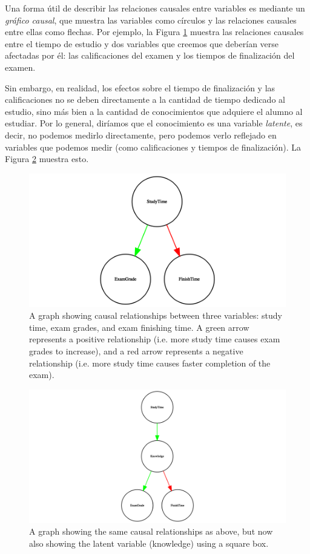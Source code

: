 \documentclass[
  12pt,
]{book}
\begin{document}
Una forma útil de describir las relaciones causales entre variables es mediante un \emph{gráfico causal}, que muestra las variables como círculos y las relaciones causales entre ellas como flechas. Por ejemplo, la Figura \ref{fig:simpleCausalGraph} muestra las relaciones causales entre el tiempo de estudio y dos variables que creemos que deberían verse afectadas por él: las calificaciones del examen y los tiempos de finalización del examen.

Sin embargo, en realidad, los efectos sobre el tiempo de finalización y las calificaciones no se deben directamente a la cantidad de tiempo dedicado al estudio, sino más bien a la cantidad de conocimientos que adquiere el alumno al estudiar. Por lo general, diríamos que el conocimiento es una variable \emph{latente}, es decir, no podemos medirlo directamente, pero podemos verlo reflejado en variables que podemos medir (como calificaciones y tiempos de finalización). La Figura \ref{fig:latentCausalGraph} muestra esto.

\begin{figure}
\includegraphics[height=0.5\textheight]{images/dag_example} \caption{A graph showing causal relationships between three variables: study time, exam grades, and exam finishing time.  A green arrow represents a positive relationship (i.e. more study time causes exam grades to increase), and a red arrow represents a negative relationship (i.e. more study time causes faster completion of the exam).}\label{fig:simpleCausalGraph}
\end{figure}

\begin{figure}
\includegraphics[height=0.5\textheight]{images/dag_latent_example} \caption{A graph showing the same causal relationships as above, but now also showing the latent variable (knowledge) using a square box.}\label{fig:latentCausalGraph}
\end{figure}
\end{document}
